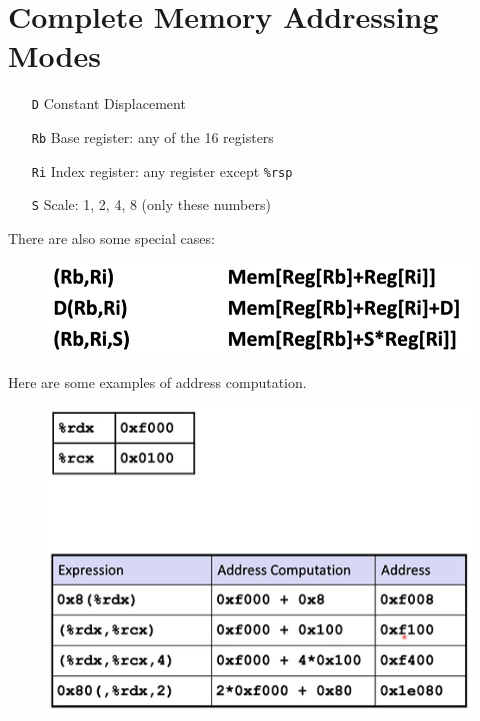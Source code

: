 \documentclass[12pt]{book}
\title{\coursetitle\linebreak\lecturename}
\author{\\Cain Susko\\ 
           \\ \\ \\
      Queen's University 
    \\School of Computing\\}
\begin{document}
\begin{titlepage}
        \maketitle
\end{titlepage}


\section*{Complete Memory Addressing Modes}
\begin{itemize}
        \item[\texttt{D}] Constant Displacement
        \item[\texttt{Rb}] Base register: any of the 16 registers
        \item[\texttt{Ri}] Index register: any register except \texttt{\%rsp}
        \item[\texttt{S}] Scale: 1, 2, 4, 8 (only these numbers)
\end{itemize}

There are also some special cases:
\begin{figure}[h]
        \centering
        \includegraphics[scale = 0.5]{./figures/spclcase}
\end{figure}

Here are some examples of address computation.
\begin{figure}[h]
        \centering
        \includegraphics[scale = 0.7]{./figures/addressex}
\end{figure}
\pagebreak
\end{document}
